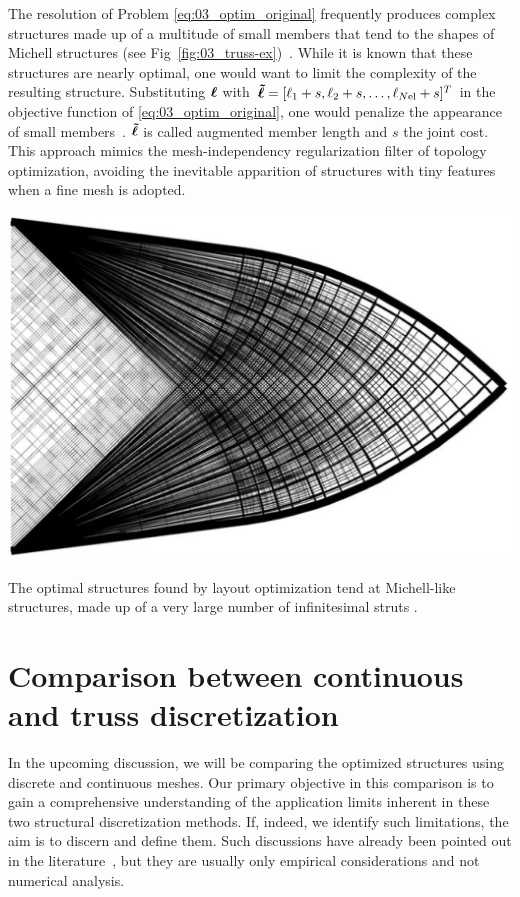 The resolution of Problem \ref{eq:03_optim_original} frequently produces complex structures made up of a multitude of small members that tend to the shapes of Michell structures (see Fig~\ref{fig:03_truss-ex})~. While it is known that these structures are nearly optimal, one would want to limit the complexity of the resulting structure. Substituting $\bm{\ell}$ with $\bm{\tilde{\ell}} = [\ell_1 + s, \ell_2 + s, \ldots,\ell_{N\text{el}} + s]^T$ in the objective function of \ref{eq:03_optim_original}, one would penalize the appearance of small members~. $\bm{\tilde{\ell}}$ is called augmented member length and $s$ the joint cost. This approach mimics the mesh-independency regularization filter of topology optimization, avoiding the inevitable apparition of structures with tiny features when a fine mesh is adopted.

\begin{marginfigure}
    \centering
    \includegraphics[width=\linewidth]{figures/03_comparison_TO_TTO/truss-ex.png}
    \caption{The optimal structures found by layout optimization tend at Michell-like structures, made up of a very large number of infinitesimal struts \cite{gilbert_layout_2003}.}
    \label{fig:03_truss-ex}
\end{marginfigure}

\section{Comparison between continuous and truss discretization} \label{sec:03_comparison}
In the upcoming discussion, we will be comparing the optimized structures using discrete and continuous meshes. Our primary objective in this comparison is to gain a comprehensive understanding of the application limits inherent in these two structural discretization methods. If, indeed, we identify such limitations, the aim is to discern and define them. Such discussions have already been pointed out in the literature~, but they are usually only empirical considerations and not numerical analysis.

